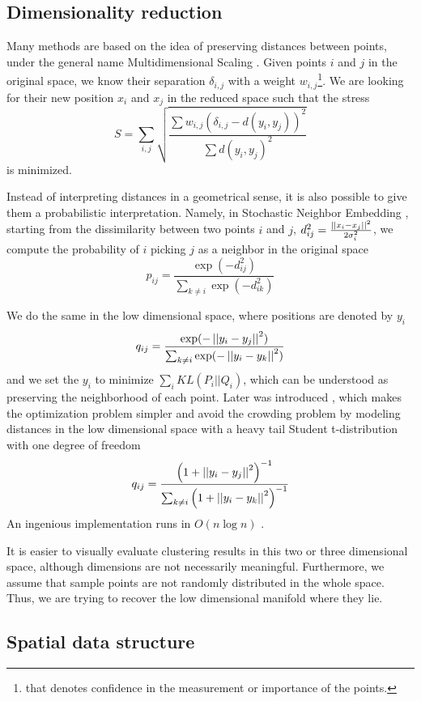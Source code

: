\subsection{Dimensionality reduction}

Many methods are based on the idea of
preserving distances between points, under the general name Multidimensional
Scaling \autocite{MDS77}. Given points $i$ and $j$ in the original space, we
know their separation $\delta_{i,j}$ with a weight $w_{i,j}$\footnote{that
denotes confidence in the measurement or importance of the points.}. We are
looking for their new position $x_i$ and $x_j$ in the reduced space such that
the stress \[ S = \sum_{i,j} \sqrt{\frac{\sum w_{i,j}(\delta_{i,j} - d(y_i,
y_j))^2}{\sum d(y_i, y_j)^2}} \] is minimized.

Instead of interpreting distances in a geometrical sense, it is also possible
to give them a probabilistic interpretation. Namely, in Stochastic Neighbor Embedding
\autocite{SNE02}, starting from the dissimilarity between two points $i$ and
$j$, $d^2_{ij} = \frac{\left|\left|x_i - x_j\right|\right|^2}{2\sigma^2_i}$, we compute the
probability of $i$ picking $j$ as a neighbor in the original space \[ p_{ij} =
\frac{\exp(-d_{ij}^2)}{\sum_{k \neq i}\exp(-d_{ik}^2)}\]

We do the same in the low dimensional space, where positions are denoted by
$y_i$ \[ q_{ij} = \frac{\exp(-\left|\left|y_i - y_j\right|\right|^2)}{\sum_{k \neq
i}\exp(-\left|\left|y_i - y_k\right|\right|^2)}\] and we set the $y_i$ to minimize $\sum_i
KL(P_i || Q_i)$, which can be understood as preserving the neighborhood of each
point. Later was introduced \tsne{} \autocite{tSNE08}, which makes the
optimization problem simpler and avoid the crowding problem by modeling
distances in the low dimensional space with a heavy tail Student t-distribution
with one degree of freedom \[ q_{ij} = \frac{\left(1+\left|\left|y_i -
y_j\right|\right|^2\right)^{-1}}{\sum_{k \neq i}\left(1+\left|\left|y_i - y_k\right|\right|^2\right)^{-1}}\]
An ingenious implementation runs in $O(n\log n)$ \autocite{BarnesHut13}.

It is easier to visually evaluate clustering results in this two or three
dimensional space, although dimensions are not necessarily meaningful.
Furthermore, we assume that sample points are not randomly distributed in the
whole space. Thus, we are trying to recover the low dimensional manifold where
they lie.

\subsection{Spatial data structure}
\label{sub:spatial-structures}

